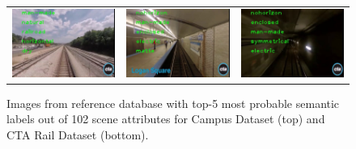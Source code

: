 \documentclass[letterpaper, 10 pt, conference]{ieeeconf}  %
\begin{document}
\begin{figure}
\begin{tabular}{ccc}
		\includegraphics[scale=\scaleVal]{4-railroad} &
		\includegraphics[scale=\scaleVal]{5-subway} &
		\includegraphics[scale=\scaleVal]{6-tunnel} \\
	\end{tabular}
	\caption{Images from reference database with top-5 most probable semantic labels out of 102 scene attributes for Campus Dataset (top) and CTA Rail Dataset (bottom).}
	\label{fig:labelledImages}
\end{figure}
\end{document}
